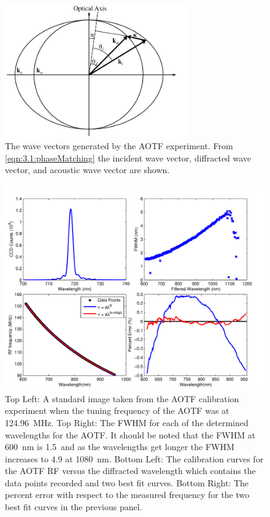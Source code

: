\documentclass[12pt]{article}
\begin{document}
\begin{figure}
    \begin{center}
    \includegraphics[width=0.7\textwidth]{./Images/3-1-AOTFWavevectorWithRefraction.pdf}
    \caption{The wave vectors generated by the AOTF experiment. From \autoref{eqn:3.1:phaseMatching} the incident wave vector, diffracted wave vector, and acoustic wave vector are shown.}
    \label{fig:3.1:ATOFWavevectors}
    \end{center}
\end{figure}

\newpage

\begin{figure}
    \includegraphics[width=1.0\textwidth]{./Images/3-1-AOTFCharaterization.pdf}
    \caption{Top Left: A standard image taken from the AOTF calibration experiment when the tuning frequency of the AOTF was at 124.96~MHz. Top Right: The FWHM for each of the determined wavelengths for the AOTF. It should be noted that the FWHM at 600~nm is 1.5~and as the wavelengths get longer the FWHM increases to 4.9 at 1080~nm. Bottom Left: The calibration curves for the AOTF RF versus the  diffracted wavelength which contains the data points recorded and two best fit curves. Bottom Right: The percent error with respect to the measured frequency for the two best fit curves in the previous panel.}
    \label{fig:3.1:AOTFCharaterization}
\end{figure}
\end{document}

